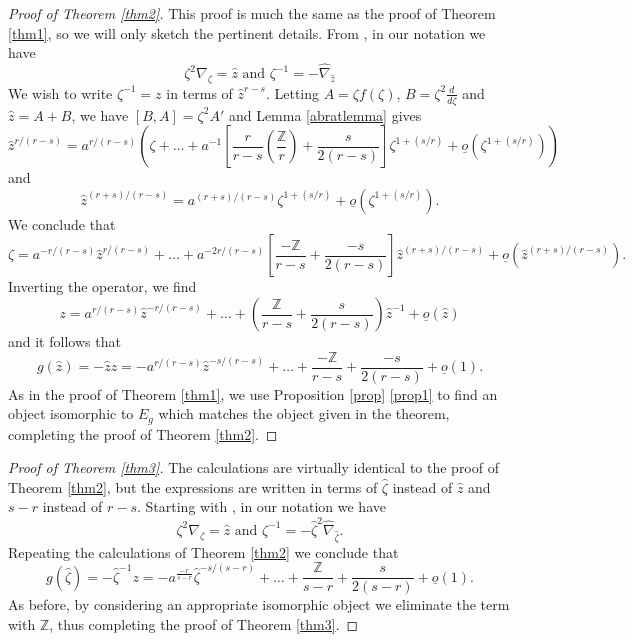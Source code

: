 \documentclass[11pt]{amsart}
\theoremstyle{theorem}
\theoremstyle{lemma}
\theoremstyle{corollary}
\theoremstyle{proposition}
\theoremstyle{definition}
\theoremstyle{remark}
\def\z{\hat{\zeta}}
\def\tz{\zeta}
\begin{document}
\begin{proof}[Proof of Theorem \ref{thm2}]
This proof is much the same as the proof of Theorem \ref{thm1}, so we will only sketch the pertinent details.  From \cite[Proposition 3.9]{bloch}, in our notation we have
\begin{equation*}
    \tz^2\nabla_{\tz}=\hat{z} \text{ and } \tz^{-1}=-\hat{\nabla}_{\hat{z}}
\end{equation*}
We wish to write $\zeta^{-1}=z$ in terms of $\hat{z}^{r-s}$. Letting $A=\tz f(\tz)$, $B=\tz^2\frac{d}{d\tz}$ and $\hat{z}=A+B$, we have $[B,A]=\zeta^2A'$ and Lemma \ref{abratlemma} gives
$$\hat{z}^{r/(r-s)}=a^{r/(r-s)}\left(\tz+\dots +a^{-1}\left[\frac{r}{r-s}\left(\frac{\mathbb{Z}}{r}\right)+\frac{s}{2(r-s)}\right]\tz^{1+(s/r)}+ \underline{o}(\tz^{1+(s/r)})\right)$$
and
$$\hat{z}^{(r+s)/(r-s)}=a^{(r+s)/(r-s)}\tz^{1+(s/r)}+ \underline{o}(\tz^{1+(s/r)}).$$
We conclude that
$$\tz=a^{-r/(r-s)}\hat{z}^{r/(r-s)}+\dots+a^{-2r/(r-s)}\left[\frac{-\mathbb{Z}}{r-s}+ \frac{-s}{2(r-s)}\right]\hat{z}^{(r+s)/(r-s)}+ \underline{o}(\hat{z}^{(r+s)/(r-s)}).$$
Inverting the operator, we find $$z=a^{r/(r-s)}\hat{z}^{-r/(r-s)}+\dots+\left(\frac{\mathbb{Z}}{r-s}+ \frac{s}{2(r-s)}\right)\hat{z}^{-1}+ \underline{o}(\hat{z})$$
and it follows that $$g(\hat{z})=-\hat{z} z=-a^{r/(r-s)}\hat{z}^{-s/(r-s)}+\dots+\frac{-\mathbb{Z}}{r-s}+\frac{-s}{2(r-s)}+\underline{o}(1).$$
As in the proof of Theorem \ref{thm1}, we use Proposition \ref{prop} \eqref{prop1} to find an object isomorphic to $E_g$ which matches the object given in the theorem, completing the proof of Theorem \ref{thm2}.
\end{proof}

\begin{proof}[Proof of Theorem \ref{thm3}]
The calculations are virtually identical to the proof of Theorem \ref{thm2}, but the expressions are written in terms of $\z$ instead of $\hat{z}$ and $s-r$ instead of $r-s$.  Starting with \cite[Proposition 3.12]{bloch}, in our notation we have
\begin{equation*}
    \tz^2\nabla_{\tz}=\hat{z} \text{ and } \tz^{-1}=-\z^2\hat{\nabla}_{\z}.
\end{equation*}
Repeating the calculations of Theorem \ref{thm2} we conclude that $$g(\z)=-\z^{-1}z = -a^{\frac{-r}{s-r}}\z^{-s/(s-r)} + \dots+\frac{\mathbb{Z}}{s-r} + \frac{s}{2(s-r)} + \underline{o}(1).$$
As before, by considering an appropriate isomorphic object we eliminate the term with $\mathbb{Z}$, thus completing the proof of Theorem \ref{thm3}.
\end{proof}
\end{document}
